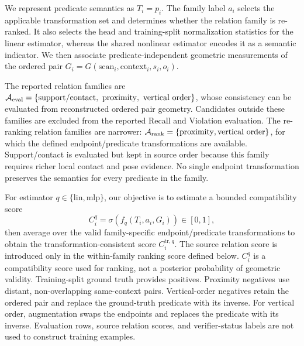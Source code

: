 We represent predicate semantics as $T_i=p_i$. The family label $a_i$ selects the applicable transformation set and determines whether the relation family is re-ranked. It also selects the head and training-split normalization statistics for the linear estimator, whereas the shared nonlinear estimator encodes it as a semantic indicator. We then associate predicate-independent geometric measurements of the ordered pair $G_i=G(\mathrm{scan}_i,\mathrm{context}_i,s_i,o_i)$.

The reported relation families are 
$\mathcal{A}_{\rm eval}=\{\mathrm{support/contact},\ \mathrm{proximity},\ \mathrm{vertical\ order}\}$, 
whose consistency can be evaluated from reconstructed ordered pair geometry. Candidates outside these families are excluded from the reported Recall and Violation evaluation. The re-ranking relation families are narrower: $\mathcal A_{\rm rank}=\{\mathrm{proximity},\mathrm{vertical\ order}\}$, for which the defined endpoint/predicate transformations are available. Support/contact is evaluated but kept in source order because this family requires richer local contact and pose evidence. No single endpoint transformation preserves the semantics for every predicate in the family. 

For estimator $q\in\{\mathrm{lin},\mathrm{mlp}\}$, our objective is to estimate a bounded compatibility score
\begin{equation}
C_i^q=\sigma\!\left(f_q(T_i,a_i,G_i)\right)\in[0,1],
\end{equation}
then average over the valid family-specific endpoint/predicate transformations to obtain the transformation-consistent score $C_i^{\mathrm{tr},q}$. The source relation score is introduced only in the within-family ranking score defined below. $C_i^q$ is a compatibility score used for ranking, not a posterior probability of geometric validity. Training-split ground truth provides positives. Proximity negatives use distant, non-overlapping same-context pairs. Vertical-order negatives retain the ordered pair and replace the ground-truth predicate with its inverse. 
For vertical order, augmentation swaps the endpoints and replaces the predicate with its inverse.
Evaluation rows, source relation scores, and verifier-status labels are not used to construct training examples. 

